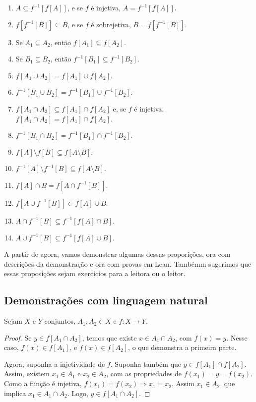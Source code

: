 \begin{enumerate}
    \item $A \subseteq f^{-1}[f[A]]$, e se $f$ é injetiva, $A = f^{-1}[f[A]]$.
    \item $f[f^{-1}[B]] \subseteq B$, e se $f$ é sobrejetiva, $B = f[f^{-1}[B]]$.
    \item Se $A_1 \subseteq A_2$, então $f[A_1] \subseteq f[A_2]$.
    \item Se $B_1 \subseteq B_2$, então $f^{-1}[B_1] \subseteq f^{-1}[B_2]$.
    \item $f[A_1 \cup A_2] = f[A_1] \cup f[A_2]$.
    \item $f^{-1}[B_1 \cup B_2] = f^{-1}[B_1] \cup f^{-1}[B_2]$.
    \item $f[A_1 \cap A_2] \subseteq f[A_1] \cap f[A_2]$ e, se $f$ é injetiva, $f[A_1 \cap A_2] = f[A_1] \cap f[A_2]$.
    \item $f^{-1}[B_1 \cap B_2] = f^{-1}[B_1] \cap f^{-1}[B_2]$.
    \item $f[A] \setminus f[B] \subseteq f[A\setminus B]$.
    \item $f^{-1}[A] \setminus f^{-1}[B] \subseteq f[A \setminus B]$.
    \item $f[A] \cap B = f[A \cap f^{-1}[B]]$.
    \item $f[A \cup f^{-1}[B]] \subset f[A] \cup B $.
    \item $A \cap f^{-1}[B] \subseteq f^{-1}[f[A] \cap B]$.
    \item $A \cup f^{-1}[B] \subseteq f^{-1}[f[A] \cup B]$.
\end{enumerate}

A partir de agora, vamos demonstrar algumas dessas proporições, ora
com descrições da demonstração e ora com provas em Lean. Tambémm sugerimos
que essas proposições sejam exercícios para a leitora ou o leitor.

\subsection{Demonstrações com linguagem natural}

\begin{theorem}[Item 7]
    \label{exerc1}
    Sejam $X$ e $Y$ conjuntos, $A_1, A_2 \in X$ e $f: X \to Y$.
\end{theorem}

\begin{proof}
    Se $y \in f[A_1 \cap A_2]$, temos que existe $x \in A_1 \cap A_2$, com $f(x) = y$.
    Nesse caso, $f(x) \in f[A_1]$, e $f(x) \in f[A_2]$, o que demonstra a primeira parte.

    Agora, suponha a injetividade de $f$. Suponha também que $y \in f[A_1] \cap f[A_2]$. Assim, existem
    $x_1 \in A_1$ e $x_2 \in A_2$, com as propriedades de $f(x_1) = y = f(x_2)$. Como a função é injetiva,
    $f(x_1) = f(x_2) \Rightarrow x_1 = x_2$. Assim $x_1 \in A_2$, que implica $x_1 \in A_1 \cap A_2$. Logo,
    $y \in f[A_1 \cap A_2]$.
\end{proof}


